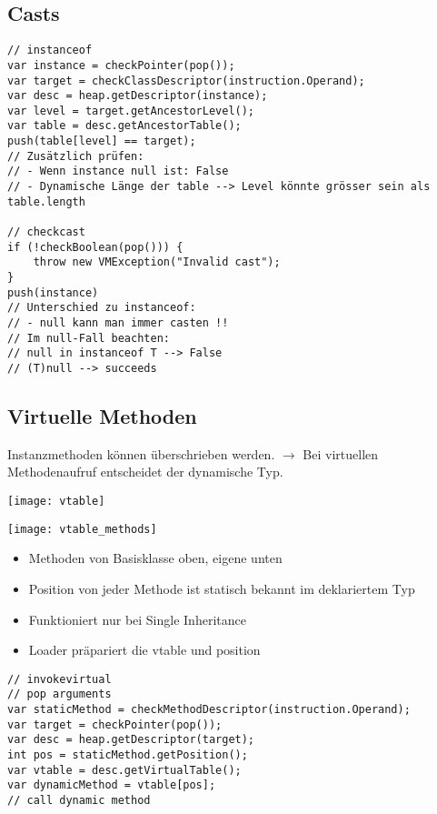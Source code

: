 \subsection{Casts}
\begin{lstlisting}
// instanceof
var instance = checkPointer(pop());
var target = checkClassDescriptor(instruction.Operand);
var desc = heap.getDescriptor(instance);
var level = target.getAncestorLevel();
var table = desc.getAncestorTable();
push(table[level] == target);
// Zusätzlich prüfen:
// - Wenn instance null ist: False
// - Dynamische Länge der table --> Level könnte grösser sein als table.length

// checkcast
if (!checkBoolean(pop())) {
    throw new VMException("Invalid cast");
}
push(instance)
// Unterschied zu instanceof:
// - null kann man immer casten !!
// Im null-Fall beachten:
// null in instanceof T --> False
// (T)null --> succeeds
\end{lstlisting}

\subsection{Virtuelle Methoden}
Instanzmethoden können überschrieben werden. $\rightarrow$ Bei virtuellen Methodenaufruf entscheidet der dynamische Typ.\\
\begin{minipage}{0.4\linewidth}
    \texttt{[image: vtable]}
\end{minipage}
\begin{minipage}{0.6\linewidth}
    \texttt{[image: vtable\_methods]}
\end{minipage}
\begin{itemize}[topsep=0pt]
    \itemsep -0.2em
    \item Methoden von Basisklasse oben, eigene unten
    \item Position von jeder Methode ist statisch bekannt im deklariertem Typ
    \item Funktioniert nur bei Single Inheritance
    \item Loader präpariert die vtable und position
\end{itemize}
\begin{lstlisting}
// invokevirtual
// pop arguments
var staticMethod = checkMethodDescriptor(instruction.Operand);
var target = checkPointer(pop());
var desc = heap.getDescriptor(target);
int pos = staticMethod.getPosition();
var vtable = desc.getVirtualTable();
var dynamicMethod = vtable[pos];
// call dynamic method
\end{lstlisting}

